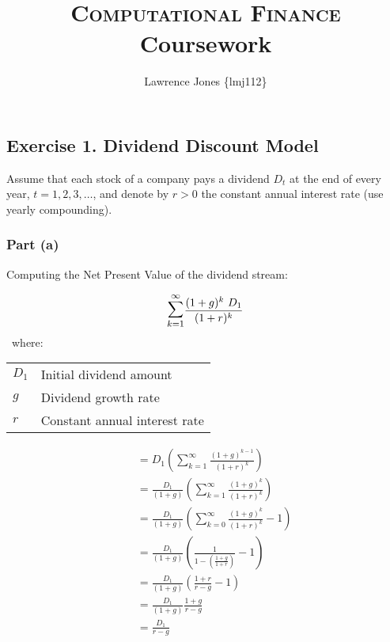\documentclass[11pt]{article}
\title{\textsc{Computational Finance}\\Coursework}
\author{Lawrence Jones \{lmj112\}}
\date{}
\makeatletter
\newenvironment{conditions}
  {\par\vspace{\abovedisplayskip}\noindent\begin{tabular}{>{$}l<{$} @{${}={}$} l}}
  {\end{tabular}\par\vspace{\belowdisplayskip}}
\makeatother
\begin{document}
\maketitle


\subsection*{Exercise 1. Dividend Discount Model}

Assume that each stock of a company pays a dividend $D_t$ at the end of every
year, $t = 1, 2, 3, \ldots$, and denote by $r > 0$ the constant annual interest
rate (use yearly compounding).

\subsubsection*{Part (a)}

Computing the Net Present Value of the dividend stream:

\setcounter{equation}{0}
\begin{equation}
  \mathlarger{\mathlarger{\sum}}_{k=1}^{\infty}
    \frac{(1 + g)^{k}~D_{1}}{(1+r)^{k}}
\end{equation}
\
where:

\begin{conditions}
    D_{1}           & Initial dividend amount \\
    g               & Dividend growth rate \\
    r               & Constant annual interest rate
\end{conditions}

\setcounter{equation}{0}
\begin{eqnarray}
  &&= D_{1}\left(\sum_{k=1}^{\infty} \frac{\left(1+g\right)^{k-1}}{\left(1+r\right)^{k}}\right) \\
  &&= \frac{D_{1}}{\left(1+g\right)} \left(\sum_{k=1}^{\infty} \frac{\left(1+g\right)^{k}}{\left(1+r\right)^{k}}\right) \\
  &&= \frac{D_{1}}{\left(1+g\right)} \left(\sum_{k=0}^{\infty} \frac{\left(1+g\right)^{k}}{\left(1+r\right)^{k}} - 1\right) \\
  &&= \frac{D_{1}}{\left(1+g\right)} \left(\frac{1}{1 - \left(\frac{1+g}{1+r}\right)} - 1\right) \\
  &&= \frac{D_{1}}{\left(1+g\right)} \left(\frac{1+r}{r-g} - 1\right) \\
  &&= \frac{D_{1}}{\left(1+g\right)} \frac{1+g}{r-g} \\
  &&= \frac{D_{1}}{r-g}
\end{eqnarray}
\end{document}

